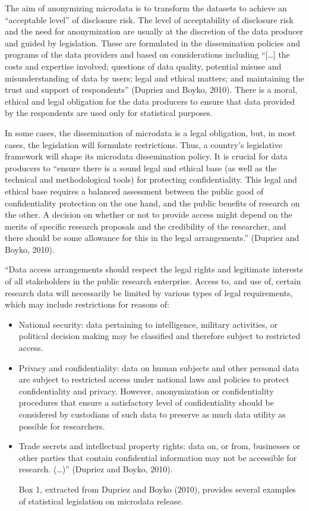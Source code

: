 \documentclass[letterpaper,10pt,english]{sphinxmanual}
\begin{document}
The aim of anonymizing microdata is to transform the datasets to achieve
an “acceptable level” of disclosure risk. The level of acceptability of
disclosure risk and the need for anonymization are usually at the
discretion of the data producer and guided by legislation. These are
formulated in the dissemination policies and programs of the data
providers and based on considerations including “{[}…{]} the costs and
expertise involved; questions of data quality, potential misuse and
misunderstanding of data by users; legal and ethical matters; and
maintaining the trust and support of respondents” (Dupriez and Boyko,
2010). There is a moral, ethical and legal obligation for the data
producers to ensure that data provided by the respondents are used only
for statistical purposes.

In some cases, the dissemination of microdata is a legal obligation,
but, in most cases, the legislation will formulate restrictions. Thus, a
country’s legislative framework will shape its microdata dissemination
policy. It is crucial for data producers to “ensure there is a sound
legal and ethical base (as well as the technical and methodological
tools) for protecting confidentiality. This legal and ethical base
requires a balanced assessment between the public good of
confidentiality protection on the one hand, and the public benefits of
research on the other. A decision on whether or not to provide access
might depend on the merits of specific research proposals and the
credibility of the researcher, and there should be some allowance for
this in the legal arrangements.” (Dupriez and Boyko, 2010).

“Data access arrangements should respect the legal rights and legitimate
interests of all stakeholders in the public research enterprise. Access
to, and use of, certain research data will necessarily be limited by
various types of legal requirements, which may include restrictions for
reasons of:
\begin{itemize}
\item {} 
National security: data pertaining to intelligence, military
activities, or political decision making may be classified and
therefore subject to restricted access.

\item {} 
Privacy and confidentiality: data on human subjects and other
personal data are subject to restricted access under national laws
and policies to protect confidentiality and privacy. However,
anonymization or confidentiality procedures that ensure a
satisfactory level of confidentiality should be considered by
custodians of such data to preserve as much data utility as possible
for researchers.

\item {} 
Trade secrets and intellectual property rights: data on, or from,
businesses or other parties that contain confidential information may
not be accessible for research. (…)” (Dupriez and Boyko, 2010).

Box 1, extracted from Dupriez and Boyko (2010), provides several
examples of statistical legislation on microdata release.

\end{itemize}
\end{document}

